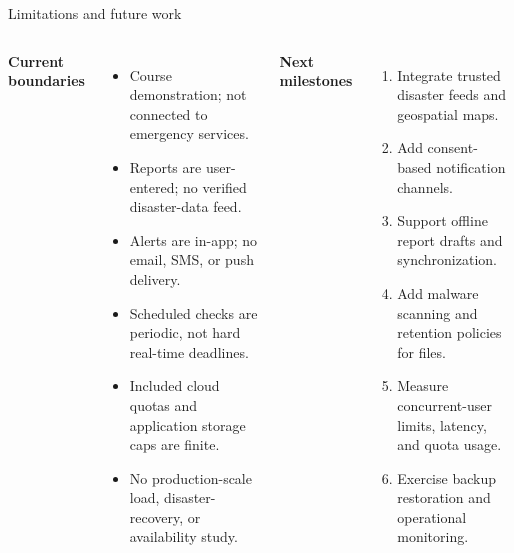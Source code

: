 \documentclass[aspectratio=169,10pt]{beamer}
\newcommand{\items}{\setlength\itemsep{.20cm}}
\begin{document}
\begin{frame}{Limitations and future work}
\begin{columns}[T,onlytextwidth]
\textbf{Current boundaries}
\begin{itemize}\items
\item Course demonstration; not connected to emergency services.
\item Reports are user-entered; no verified disaster-data feed.
\item Alerts are in-app; no email, SMS, or push delivery.
\item Scheduled checks are periodic, not hard real-time deadlines.
\item Included cloud quotas and application storage caps are finite.
\item No production-scale load, disaster-recovery, or availability study.
\end{itemize}
\textbf{Next milestones}
\begin{enumerate}\items
\item Integrate trusted disaster feeds and geospatial maps.
\item Add consent-based notification channels.
\item Support offline report drafts and synchronization.
\item Add malware scanning and retention policies for files.
\item Measure concurrent-user limits, latency, and quota usage.
\item Exercise backup restoration and operational monitoring.
\end{enumerate}
\end{columns}
\end{frame}
\end{document}

